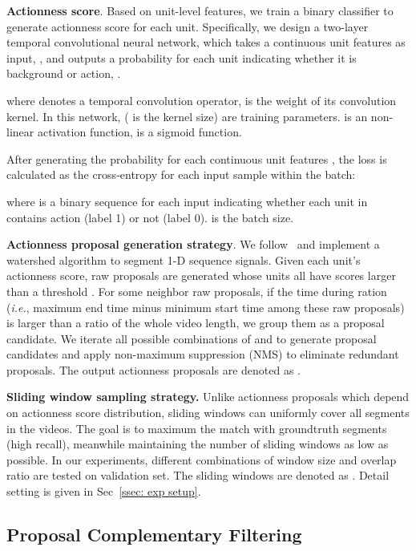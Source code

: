 \documentclass[runningheads]{llncs}
\begin{document}
\textbf{Actionness score}. Based on unit-level features, we train a binary classifier to generate actionness score for each unit. Specifically, we design a two-layer temporal convolutional neural network, which takes a  continuous unit features as input, , and outputs a probability for each unit indicating whether it is background or action, . 

where  denotes a temporal convolution operator,  is the weight of its convolution kernel. 
In this network,  ( is the kernel size) are training parameters.
 is an non-linear activation function,  is a sigmoid function.

After generating the probability  for each continuous unit features , the loss is calculated as the cross-entropy for each input sample within the batch: 

where  is a binary sequence for each input  indicating whether each unit in  contains action (label 1) or not (label 0).  is the batch size.


\textbf{Actionness proposal generation strategy}. We follow~\cite{Zhao_2017_ICCV} and implement a watershed algorithm \cite{roerdink2000watershed} to segment 1-D sequence signals. 
Given each unit's actionness score, raw proposals are generated whose units all have scores larger than a threshold .
For some neighbor raw proposals, if the time during ration (\emph{i.e.}, maximum end time minus minimum start time among these raw proposals) is larger than a ratio  of the whole video length, we group them as a proposal candidate. 
We iterate all possible combinations of  and  to generate proposal candidates and apply non-maximum suppression (NMS) to eliminate redundant proposals. 
The output actionness proposals are denoted as .

\textbf{Sliding window sampling strategy.} Unlike actionness proposals which depend on actionness score distribution, sliding windows can uniformly cover all segments in the videos. The goal is to maximum the match with groundtruth segments (high recall), meanwhile maintaining the number of sliding windows as low as possible. In our experiments, different combinations of window size and overlap ratio are tested on validation set. The sliding windows are denoted as . Detail setting is given in Sec~\ref{ssec: exp setup}.

\subsection{Proposal Complementary Filtering}
\end{document}
